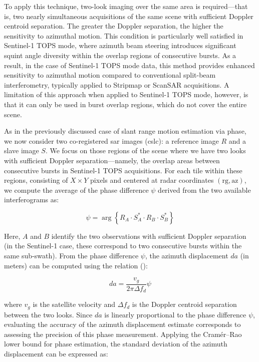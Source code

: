 To apply this technique, two-look imaging over the same area is required—that is, two nearly simultaneous acquisitions of the same scene with sufficient Doppler centroid separation. The greater the Doppler separation, the higher the sensitivity to azimuthal motion. This condition is particularly well satisfied in Sentinel-1 TOPS mode, where azimuth beam steering introduces significant squint angle diversity within the overlap regions of consecutive bursts. As a result, in the case of Sentinel-1 TOPS mode data, this method provides enhanced sensitivity to azimuthal motion compared to conventional split-beam interferometry, typically applied to Stripmap or ScanSAR acquisitions. A limitation of this approach when applied to Sentinel-1 TOPS mode, however, is that it can only be used in burst overlap regions, which do not cover the entire scene. 

As in the previously discussed case of slant range motion estimation via phase, we now consider two co-registered \acs{sar} images (\acs{cslc}): a reference image $R$ and a slave image $S$. We focus on those regions of the scene where we have two looks with sufficient Doppler separation—namely, the overlap areas between consecutive bursts in Sentinel-1 TOPS acquisitions. For each tile within these regions, consisting of \(X \times Y\) pixels and centered at radar coordinates \((\mathrm{rg}, \mathrm{az})\), we compute the average of the phase difference $\psi$ derived from the two available interferograms as:

\begin{equation}
\psi = \arg\left\{R_{A} \cdot S_{A}^{*} \cdot R_{B} \cdot S_{B}^{*}\right\}
\label{eq:psi}
\end{equation}

Here, $A$ and $B$ identify the two observations with sufficient Doppler separation (in the Sentinel-1 case, these correspond to two consecutive bursts within the same sub-swath). From the phase difference $\psi$, the azimuth displacement $da$ (in meters) can be computed using the relation (\cite{Scheiber1999}):

\begin{equation}
da = \frac{v_{g}}{2\pi \Delta f_{d}} \psi
\label{eq:da_from_psi}
\end{equation}

where $v_{g}$ is the satellite velocity and $\Delta f_{d}$ is the Doppler centroid separation between the two looks. Since $da$ is linearly proportional to the phase difference $\psi$, evaluating the accuracy of the azimuth displacement estimate corresponds to assessing the precision of this phase measurement. Applying the Cramér–Rao lower bound for phase estimation, the standard deviation of the azimuth displacement can be expressed as:

